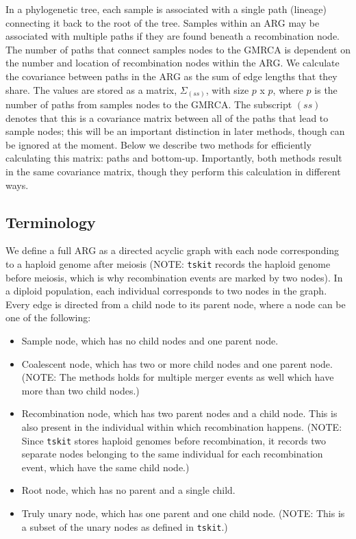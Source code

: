 In a phylogenetic tree, each sample is associated with a single path (lineage) connecting it back to the root of the tree. Samples within an ARG may be associated with multiple paths if they are found beneath a recombination node. The number of paths that connect samples nodes to the GMRCA is dependent on the number and location of recombination nodes within the ARG. We calculate the covariance between paths in the ARG as the sum of edge lengths that they share. The values are stored as a matrix, $\Sigma_{(ss)}$, with size $p$ x $p$, where $p$ is the number of paths from samples nodes to the GMRCA. The subscript $(ss)$ denotes that this is a covariance matrix between all of the paths that lead to sample nodes; this will be an important distinction in later methods, though can be ignored at the moment. Below we describe two methods for efficiently calculating this matrix: paths and bottom-up. Importantly, both methods result in the same covariance matrix, though they perform this calculation in different ways.



\subsection{Terminology}


We define a full ARG as a directed acyclic graph with each node corresponding to a haploid genome after meiosis (NOTE: {\tt tskit} records the haploid genome before meiosis, which is why recombination events are marked by two nodes). In a diploid population, each individual corresponds to two nodes in the graph. Every edge is directed from a child node to its parent node, where a node can be one of the following:
\begin{itemize}
    \item Sample node, which has no child nodes and one parent node.
    \item Coalescent node, which has two or more child nodes and one parent node. (NOTE: The methods holds for multiple merger events as well which have more than two child nodes.)
    \item Recombination node, which has two parent nodes and a child node. This is also present in the individual within which recombination happens. (NOTE: Since {\tt tskit} stores haploid genomes before recombination, it records two separate nodes belonging to the same individual for each recombination event, which have the same child node.)
    \item Root node, which has no parent and a single child. 
    \item Truly unary node, which has one parent and one child node. (NOTE: This is a subset of the unary nodes as defined in {\tt tskit}.)
\end{itemize}

